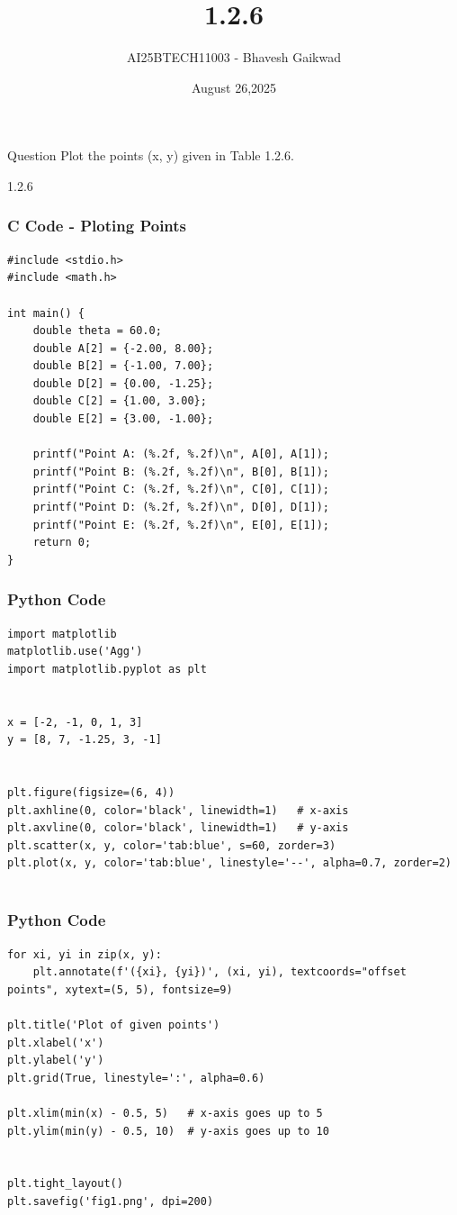 \documentclass{beamer}
\title
{1.2.6}
\date{August 26,2025}
\author 
{AI25BTECH11003 - Bhavesh Gaikwad}
\begin{document}
\frame{\titlepage}
\begin{frame}{Question}
Plot the points (x, y) given in Table 1.2.6.
\begin{table}[h!]    
  \centering
  
  \caption{1.2.6}
  \label{tab:Beamer/tables/table.tex}
\end{table}
\end{frame}


\begin{frame}[fragile]
    \frametitle{C Code - Ploting Points}

    \begin{lstlisting}
#include <stdio.h>
#include <math.h>

int main() {
    double theta = 60.0; 
    double A[2] = {-2.00, 8.00};
    double B[2] = {-1.00, 7.00};
    double D[2] = {0.00, -1.25};
    double C[2] = {1.00, 3.00};
    double E[2] = {3.00, -1.00};
   
    printf("Point A: (%.2f, %.2f)\n", A[0], A[1]);
    printf("Point B: (%.2f, %.2f)\n", B[0], B[1]);
    printf("Point C: (%.2f, %.2f)\n", C[0], C[1]);
    printf("Point D: (%.2f, %.2f)\n", D[0], D[1]);
    printf("Point E: (%.2f, %.2f)\n", E[0], E[1]);
    return 0;
}
    \end{lstlisting}
\end{frame}


\begin{frame}[fragile]
    \frametitle{Python Code}
    \begin{lstlisting}
import matplotlib
matplotlib.use('Agg')            
import matplotlib.pyplot as plt


x = [-2, -1, 0, 1, 3]
y = [8, 7, -1.25, 3, -1]


plt.figure(figsize=(6, 4))
plt.axhline(0, color='black', linewidth=1)   # x-axis
plt.axvline(0, color='black', linewidth=1)   # y-axis
plt.scatter(x, y, color='tab:blue', s=60, zorder=3)
plt.plot(x, y, color='tab:blue', linestyle='--', alpha=0.7, zorder=2)


    \end{lstlisting}
\end{frame}


\begin{frame}[fragile]
    \frametitle{Python Code}
    \begin{lstlisting}
for xi, yi in zip(x, y):
    plt.annotate(f'({xi}, {yi})', (xi, yi), textcoords="offset points", xytext=(5, 5), fontsize=9)

plt.title('Plot of given points')
plt.xlabel('x')
plt.ylabel('y')
plt.grid(True, linestyle=':', alpha=0.6)

plt.xlim(min(x) - 0.5, 5)   # x-axis goes up to 5
plt.ylim(min(y) - 0.5, 10)  # y-axis goes up to 10


plt.tight_layout()
plt.savefig('fig1.png', dpi=200)
    \end{lstlisting}
\end{frame}
\end{document}
